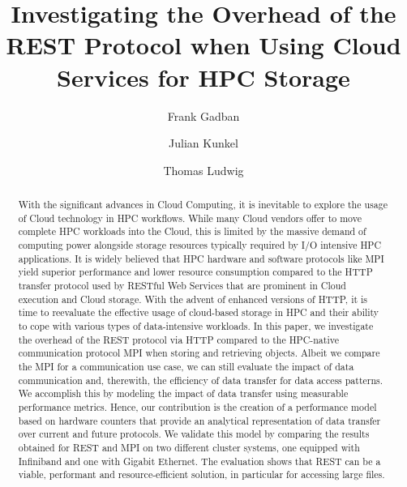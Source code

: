 \documentclass[runningheads]{llncs}
\begin{document}
\title{Investigating the Overhead of the REST Protocol when Using Cloud Services for HPC Storage}
\author{Frank Gadban \and Julian Kunkel \and Thomas Ludwig}

\maketitle

\begin{abstract}
With the significant advances in Cloud Computing, it is inevitable to explore the usage of Cloud technology in HPC workflows. While many Cloud vendors offer to move complete HPC workloads into the Cloud, this is limited by the massive demand of computing power alongside storage resources typically required by I/O intensive HPC applications. It is widely believed that HPC hardware and software protocols like MPI yield superior performance and lower resource consumption compared to the HTTP transfer protocol used by RESTful Web Services that are prominent in Cloud execution and Cloud storage. With the advent of enhanced versions of HTTP, it is time to reevaluate the effective usage of cloud-based storage in HPC and their ability to cope with various types of data-intensive workloads.
In this paper, we investigate the overhead of the REST protocol via HTTP compared to the HPC-native communication protocol MPI when storing and retrieving objects. Albeit we compare the MPI for a communication use case, we can still evaluate the impact of data communication and, therewith, the efficiency of data transfer for data access patterns. We accomplish this by modeling the impact of data transfer using measurable performance metrics. Hence, our contribution is the creation of a performance model based on hardware counters that provide an analytical representation of data transfer over current and future protocols. We validate this model by comparing the results obtained for REST and MPI on two different cluster systems, one equipped with Infiniband and one with Gigabit Ethernet. The evaluation shows that REST can be a viable, performant and resource-efficient solution, in particular for accessing large files.
\end{abstract}
%
%
%
\end{document}
